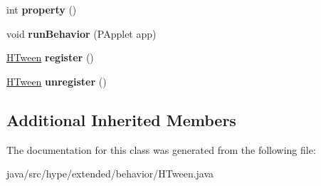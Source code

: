 \begin{DoxyCompactItemize}
\item 
\hypertarget{classhype_1_1extended_1_1behavior_1_1_h_tween_a9b25b9ae05d39970cb3ee85a537cf8f8}{int {\bfseries property} ()}\label{classhype_1_1extended_1_1behavior_1_1_h_tween_a9b25b9ae05d39970cb3ee85a537cf8f8}

\item 
\hypertarget{classhype_1_1extended_1_1behavior_1_1_h_tween_a328e3d3dd0ebcc0e7a7f9c56fbe1cd97}{void {\bfseries run\-Behavior} (P\-Applet app)}\label{classhype_1_1extended_1_1behavior_1_1_h_tween_a328e3d3dd0ebcc0e7a7f9c56fbe1cd97}

\item 
\hypertarget{classhype_1_1extended_1_1behavior_1_1_h_tween_a54496b6e6923ff194a94e130b3aeeded}{\hyperlink{classhype_1_1extended_1_1behavior_1_1_h_tween}{H\-Tween} {\bfseries register} ()}\label{classhype_1_1extended_1_1behavior_1_1_h_tween_a54496b6e6923ff194a94e130b3aeeded}

\item 
\hypertarget{classhype_1_1extended_1_1behavior_1_1_h_tween_a9655b58a402c97e33d7474909cf585a8}{\hyperlink{classhype_1_1extended_1_1behavior_1_1_h_tween}{H\-Tween} {\bfseries unregister} ()}\label{classhype_1_1extended_1_1behavior_1_1_h_tween_a9655b58a402c97e33d7474909cf585a8}

\end{DoxyCompactItemize}
\subsection*{Additional Inherited Members}


The documentation for this class was generated from the following file\-:\begin{DoxyCompactItemize}
\item 
java/src/hype/extended/behavior/H\-Tween.\-java\end{DoxyCompactItemize}
